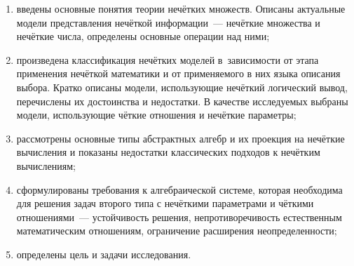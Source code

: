 \begin{enumerate}
  \item введены основные понятия теории нечётких множеств. Описаны актуальные модели представления нечёткой информации~--- нечёткие множества и нечёткие числа, определены основные операции над ними; 
  \item произведена классификация нечётких моделей в~зависимости от этапа применения нечёткой математики и от применяемого в них языка описания выбора. Кратко описаны модели, использующие нечёткий логический вывод, перечислены их достоинства и недостатки. В качестве исследуемых выбраны модели, использующие чёткие отношения и нечёткие параметры;
  \item рассмотрены основные типы абстрактных алгебр и их проекция на нечёткие вычисления и показаны недостатки классических подходов к нечётким вычислениям;
  \item сформулированы требования к алгебраической системе, которая необходима для решения задач второго типа с нечёткими параметрами и чёткими отношениями~--- устойчивость решения, непротиворечивость естественным математическим отношениям, ограничение расширения неопределенности;
  \item определены цель и задачи исследования.
\end{enumerate}

